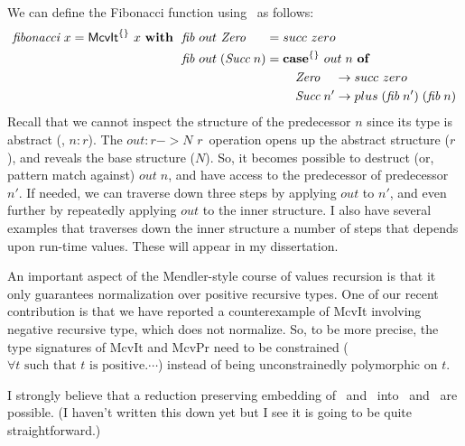 We can define the Fibonacci function using \McvIt\ as follows:
\begin{align*}
\textit{fibonacci}~x = \textsf{McvIt}^{\{\}}~x~\textbf{with}~~
&  \textit{fib} ~out ~\textit{Zero}~~~~\; = succ~zero \\
&  \textit{fib} ~out \;(\textit{Succ}\;n) =
            \textbf{case}^{\{\}}~out\;n~\textbf{of} \\
&\qquad\qquad\qquad\qquad\quad
              \textit{Zero}~~~\, -> succ~zero \\
&\qquad\qquad\qquad\qquad\quad
              \textit{Succ}\;n'  -> plus\;(\textit{fib}\;n')\;(\textit{fib}\;n)
\end{align*}
Recall that we cannot inspect the structure of the predecessor $n$ since
its type is abstract (\ie, $n:r$). The $out : r -> \textit{N r}\,$ operation
opens up the abstract structure ($r$), and reveals the base structure ($N$).
So, it becomes possible to destruct (or, pattern match against) $out\;n$,
and have access to the predecessor of predecessor $n'$. If needed, we can
traverse down three steps by applying $out$ to $n'$, and even further by
repeatedly applying $out$ to the inner structure. I also have several examples
that traverses down the inner structure a number of steps that depends
upon run-time values. These will appear in my dissertation.

An important aspect of the Mendler-style course of values recursion is that
it only guarantees normalization over positive recursive types. One of our
recent contribution is that we have reported a counterexample of \textsf{McvIt}
involving negative recursive type, which does not normalize. So, to be more
precise, the type signatures of \textsf{McvIt} and \textsf{McvPr} need to
be constrained ($\forall t \text{~such that~$t$ is positive}.\cdots$)
instead of being unconstrainedly polymorphic on $t$.

I strongly believe that a reduction preserving embedding of
\McvIt\ and \McvPr\ into \Fixw\, and \Fixi\ are possible.
(I haven't written this down yet but I see it is going to be
quite straightforward.)

